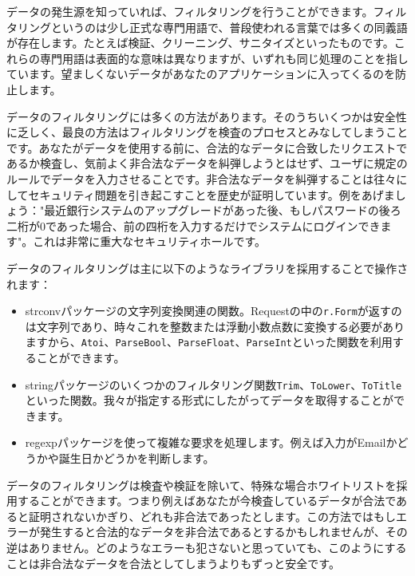 データの発生源を知っていれば、フィルタリングを行うことができます。フィルタリングというのは少し正式な専門用語で、普段使われる言葉では多くの同義語が存在します。たとえば検証、クリーニング、サニタイズといったものです。これらの専門用語は表面的な意味は異なりますが、いずれも同じ処理のことを指しています。望ましくないデータがあなたのアプリケーションに入ってくるのを防止します。

データのフィルタリングには多くの方法があります。そのうちいくつかは安全性に乏しく、最良の方法はフィルタリングを検査のプロセスとみなしてしまうことです。あなたがデータを使用する前に、合法的なデータに合致したリクエストであるか検査し、気前よく非合法なデータを糾弾しようとはせず、ユーザに規定のルールでデータを入力させることです。非合法なデータを糾弾することは往々にしてセキュリティ問題を引き起こすことを歴史が証明しています。例をあげましょう："最近銀行システムのアップグレードがあった後、もしパスワードの後ろ二桁が0であった場合、前の四桁を入力するだけでシステムにログインできます"。これは非常に重大なセキュリティホールです。

データのフィルタリングは主に以下のようなライブラリを採用することで操作されます：

\begin{itemize}
  \item strconvパッケージの文字列変換関連の関数。Requestの中の\texttt{r.Form}が返すのは文字列であり、時々これを整数または浮動小数点数に変換する必要がありますから、\texttt{Atoi}、\texttt{ParseBool}、\texttt{ParseFloat}、\texttt{ParseInt}といった関数を利用することができます。
  \item stringパッケージのいくつかのフィルタリング関数\texttt{Trim}、\texttt{ToLower}、\texttt{ToTitle}といった関数。我々が指定する形式にしたがってデータを取得することができます。
  \item regexpパッケージを使って複雑な要求を処理します。例えば入力がEmailかどうかや誕生日かどうかを判断します。
\end{itemize}

データのフィルタリングは検査や検証を除いて、特殊な場合ホワイトリストを採用することができます。つまり例えばあなたが今検査しているデータが合法であると証明されないかぎり、どれも非合法であったとします。この方法ではもしエラーが発生すると合法的なデータを非合法であるとするかもしれませんが、その逆はありません。どのようなエラーも犯さないと思っていても、このようにすることは非合法なデータを合法としてしまうよりもずっと安全です。
